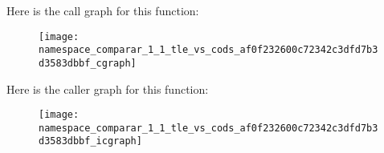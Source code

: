 \-Here is the call graph for this function\-:\nopagebreak
\begin{figure}[H]
\begin{center}
\leavevmode
\texttt{[image: namespace\_comparar\_1\_1\_tle\_vs\_cods\_af0f232600c72342c3dfd7b3d3583dbbf\_cgraph]}
\end{center}
\end{figure}




\-Here is the caller graph for this function\-:\nopagebreak
\begin{figure}[H]
\begin{center}
\leavevmode
\texttt{[image: namespace\_comparar\_1\_1\_tle\_vs\_cods\_af0f232600c72342c3dfd7b3d3583dbbf\_icgraph]}
\end{center}
\end{figure}


